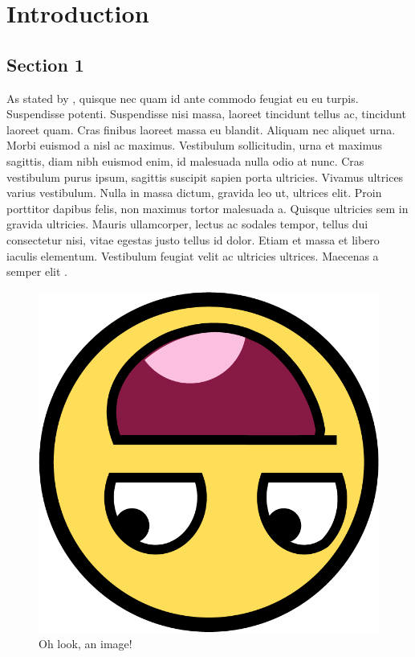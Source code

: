 
\chapter{Introduction}
\label{chap:introduction}
\graphicspath{{./img/Introduction/}}

\section{Section 1}
\label{sec:section_1}
    As stated by \cite{lamport1994latex}, quisque nec quam id ante commodo feugiat eu eu turpis. Suspendisse potenti. Suspendisse nisi massa, laoreet tincidunt tellus ac, tincidunt laoreet quam. Cras finibus laoreet massa eu blandit. Aliquam nec aliquet urna. Morbi euismod a nisl ac maximus. Vestibulum sollicitudin, urna et maximus sagittis, diam nibh euismod enim, id malesuada nulla odio at nunc. Cras vestibulum purus ipsum, sagittis suscipit sapien porta ultricies. Vivamus ultrices varius vestibulum. Nulla in massa dictum, \cite{lamport1986document} gravida leo ut, ultrices elit. Proin porttitor dapibus felis, non maximus tortor malesuada a. Quisque ultricies sem in gravida ultricies. Mauris ullamcorper, lectus ac sodales tempor, tellus dui consectetur nisi, vitae egestas justo tellus id dolor. Etiam et massa et libero iaculis elementum. Vestibulum feugiat velit ac ultricies ultrices. Maecenas a semper elit \cite{kopka1995guide}.

    \begin{figure}
        \centerline{\includegraphics[scale=0.25]{face.png}}
        \caption{Oh look, an image!}
        \label{fig:example_img}
    \end{figure}

